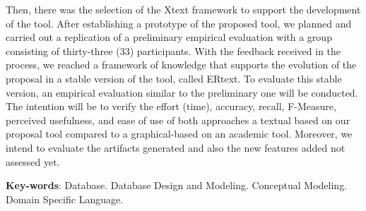 \begin{resumo}[Abstract]
Then, there was the selection of the Xtext framework to support the development of the tool.
After establishing a prototype of the proposed tool, we planned and carried out a replication of a preliminary empirical evaluation with a group consisting of thirty-three (33) participants.
With the feedback received in the process, we reached a framework of knowledge that supports the evolution of the proposal in a stable version of the tool, called ERtext.
To evaluate this stable version, an empirical evaluation similar to the preliminary one will be conducted.
The intention will be to verify the effort (time), accuracy, recall, F-Measure, perceived usefulness, and ease of use of both approaches a textual based on our proposal tool compared to a graphical-based on an academic tool.
Moreover, we intend to evaluate the artifacts generated and also the new features added not assessed yet.

\vspace{\onelineskip}

 \noindent 
 \textbf{Key-words}: Database. Database Design and Modeling. Conceptual Modeling. Domain Specific Language.
\end{resumo}